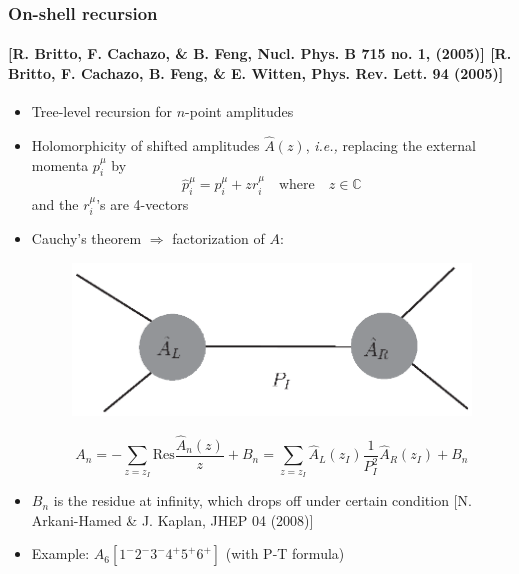 \documentclass[english]{beamer}
\newcommand{\ie}{\textit{i.e., }}
\newcommand{\res}{\mathrm{Res}}
\begin{document}
\appendix


\begin{frame}[shrink=10]
\frametitle{On-shell recursion}
\framesubtitle{
\tiny\color{blue}
[R. Britto, F. Cachazo, \& B. Feng, Nucl. Phys. B 715 no. 1, (2005)] 
[R. Britto, F. Cachazo, B. Feng, \& E. Witten, Phys. Rev. Lett. 94
(2005)]
}
\begin{itemize}


\item<1-> Tree-level recursion for $n$-point amplitudes
\item<2-> Holomorphicity of shifted amplitudes $\hat{A}(z)$, \ie replacing the external momenta $p^\mu_i$ by 
\begin{equation*}
\hat{p}^\mu_i = p^\mu_i + zr_i^\mu \quad\mathrm{where}\quad z\in\mathbb{C}
\end{equation*}
and the $r^\mu_i$'s are 4-vectors
\item<3-> Cauchy's theorem $\Rightarrow$ factorization of $A$: 
\begin{figure}[h]
  \centering
  \includegraphics[width=0.5\linewidth]{bcfw.eps}
\end{figure}
\begin{equation*}
A_n = - \sum_{z = z_I}\res\frac{\hat{A}_n(z)}{z} + B_n
=\sum_{z = z_I} \hat{A}_L(z_I)\frac{1}{P_I^2}\hat{A}_R(z_I) + B_n
\end{equation*} 
\item<4->[] $B_n$ is the residue at infinity, which drops off under certain condition 
\tiny\color{blue}[N. Arkani-Hamed \& J. Kaplan, JHEP 04 (2008)]
\color{black}\normalsize

\item<5-> Example: $A_6[1^-2^-3^-4^+5^+6^+]$ (with P-T formula)

\end{itemize}

\end{frame}

\end{document}
